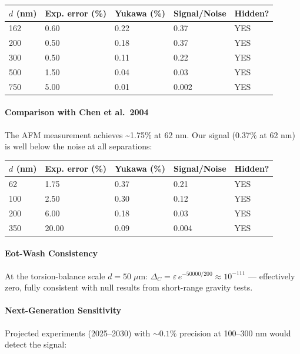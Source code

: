 \documentclass[
  11pt,
]{article}
\begin{document}
\begin{longtable}[]{@{}lllll@{}}
\toprule
\(d\) (nm) & Exp. error (\%) & Yukawa (\%) & Signal/Noise &
Hidden?\tabularnewline
\midrule
\endhead
162 & 0.60 & 0.22 & 0.37 & YES\tabularnewline
200 & 0.50 & 0.18 & 0.37 & YES\tabularnewline
300 & 0.50 & 0.11 & 0.22 & YES\tabularnewline
500 & 1.50 & 0.04 & 0.03 & YES\tabularnewline
750 & 5.00 & 0.01 & 0.002 & YES\tabularnewline
\bottomrule
\end{longtable}

\bigskip

\hypertarget{comparison-with-chen-et-al.-2004}{%
\paragraph{Comparison with Chen et
al.~2004}\label{comparison-with-chen-et-al.-2004}}

The AFM measurement achieves \textasciitilde1.75\% at 62 nm. Our signal
(0.37\% at 62 nm) is well below the noise at all separations:

\begin{longtable}[]{@{}lllll@{}}
\toprule
\(d\) (nm) & Exp. error (\%) & Yukawa (\%) & Signal/Noise &
Hidden?\tabularnewline
\midrule
\endhead
62 & 1.75 & 0.37 & 0.21 & YES\tabularnewline
100 & 2.50 & 0.30 & 0.12 & YES\tabularnewline
200 & 6.00 & 0.18 & 0.03 & YES\tabularnewline
350 & 20.00 & 0.09 & 0.004 & YES\tabularnewline
\bottomrule
\end{longtable}

\bigskip

\hypertarget{eot-wash-consistency}{%
\paragraph{Eot-Wash Consistency}\label{eot-wash-consistency}}

At the torsion-balance scale \(d = 50\;\mu\)m:
\(\Delta_C = \varepsilon \, e^{-50000/200} \approx 10^{-111}\) ---
effectively zero, fully consistent with null results from short-range
gravity tests.

\bigskip

\hypertarget{next-generation-sensitivity}{%
\paragraph{Next-Generation
Sensitivity}\label{next-generation-sensitivity}}

Projected experiments (2025--2030) with \(\sim 0.1\%\) precision at
100--300 nm would detect the signal:
\end{document}
